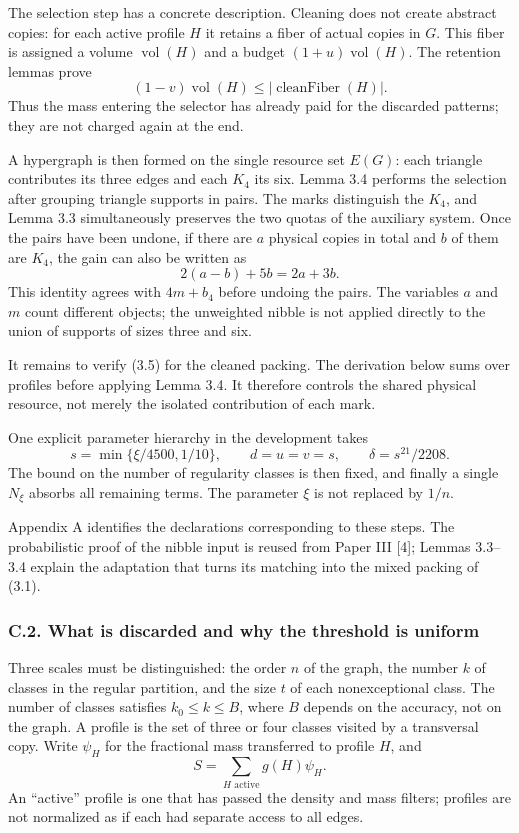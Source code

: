 \documentclass[english,11pt,a4paper]{article}
\newcounter{none}
\begin{document}
The selection step has a concrete description. Cleaning does not create abstract copies: for each active profile \(H\) it retains a fiber of actual copies in \(G\). This fiber is assigned a volume \(\operatorname{vol}(H)\) and a budget \((1+u)\operatorname{vol}(H)\). The retention lemmas prove \[
(1-v)\operatorname{vol}(H)
\le |\operatorname{cleanFiber}(H)|.
\tag{3.8}
\] Thus the mass entering the selector has already paid for the discarded patterns; they are not charged again at the end.

A hypergraph is then formed on the single resource set \(E(G)\): each triangle contributes its three edges and each \(K_4\) its six. Lemma 3.4 performs the selection after grouping triangle supports in pairs. The marks distinguish the \(K_4\), and Lemma 3.3 simultaneously preserves the two quotas of the auxiliary system. Once the pairs have been undone, if there are \(a\) physical copies in total and \(b\) of them are \(K_4\), the gain can also be written as \[
2(a-b)+5b=2a+3b.
\tag{3.9}
\] This identity agrees with \(4m+b_4\) before undoing the pairs. The variables \(a\) and \(m\) count different objects; the unweighted nibble is not applied directly to the union of supports of sizes three and six.

It remains to verify (3.5) for the cleaned packing. The derivation below sums over profiles before applying Lemma 3.4. It therefore controls the shared physical resource, not merely the isolated contribution of each mark.

One explicit parameter hierarchy in the development takes \[
s=\min\{\xi/4500,1/10\},\qquad
d=u=v=s,\qquad \delta=s^{21}/2208.
\] The bound on the number of regularity classes is then fixed, and finally a single \(N_\xi\) absorbs all remaining terms. The parameter \(\xi\) is not replaced by \(1/n\).

Appendix A identifies the declarations corresponding to these steps. The probabilistic proof of the nibble input is reused from Paper III {[}4{]}; Lemmas 3.3--3.4 explain the adaptation that turns its matching into the mixed packing of (3.1).

\subsubsection{C.2. What is discarded and why the threshold is uniform}\label{c.2.-what-is-discarded-and-why-the-threshold-is-uniform}

Three scales must be distinguished: the order \(n\) of the graph, the number \(k\) of classes in the regular partition, and the size \(t\) of each nonexceptional class. The number of classes satisfies \(k_0\le k\le B\), where \(B\) depends on the accuracy, not on the graph. A profile is the set of three or four classes visited by a transversal copy. Write \(\psi_H\) for the fractional mass transferred to profile \(H\), and \[
S=\sum_{H\text{ active}}g(H)\psi_H.
\] An ``active'' profile is one that has passed the density and mass filters; profiles are not normalized as if each had separate access to all edges.
\end{document}
